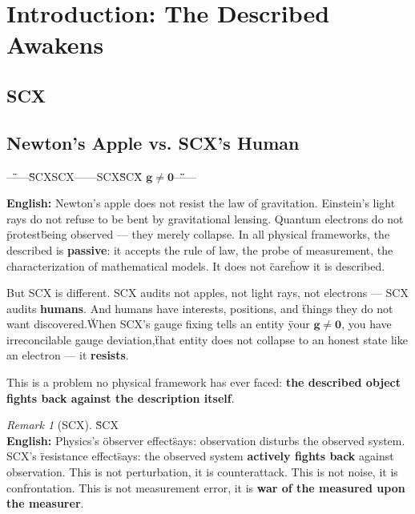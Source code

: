 \documentclass[12pt,a4paper]{article}
\theoremstyle{remark}
\newtheorem{remark}[theorem]{Remark}
\newcommand{\g}{\mathbf{g}}
\begin{document}
\section{}
\section{Introduction: The Described Awakens}

\subsection{SCX}
\subsection{Newton's Apple vs. SCX's Human}

\noindent
\textbf{} \"\"——\textbf{}\"\"

SCXSCX——SCX\textbf{}\"\"SCX\" $ \g \neq \mathbf{0} $\"\"\"——\textbf{}

\textbf{}

\vspace{6pt}
\noindent
\textbf{English:} Newton's apple does not resist the law of gravitation. Einstein's light rays do not refuse to be bent by gravitational lensing. Quantum electrons do not \"protest\" being observed — they merely collapse. In all physical frameworks, the described is \textbf{passive}: it accepts the rule of law, the probe of measurement, the characterization of mathematical models. It does not \"care\" how it is described.

But SCX is different. SCX audits not apples, not light rays, not electrons — SCX audits \textbf{humans}. And humans have interests, positions, and \"things they do not want discovered.\" When SCX's gauge fixing tells an entity \"your $ \g \neq \mathbf{0} $, you have irreconcilable gauge deviation,\" that entity does not collapse to an honest state like an electron — it \textbf{resists}.

This is a problem no physical framework has ever faced: \textbf{the described object fights back against the description itself}.

\begin{remark}[SCX]
\"\"SCX\"\"\textbf{}\textbf{}\\
\textbf{English:} Physics's \"observer effect\" says: observation disturbs the observed system. SCX's \"resistance effect\" says: the observed system \textbf{actively fights back} against observation. This is not perturbation, it is counterattack. This is not noise, it is confrontation. This is not measurement error, it is \textbf{war of the measured upon the measurer}.
\end{remark}
\end{document}
